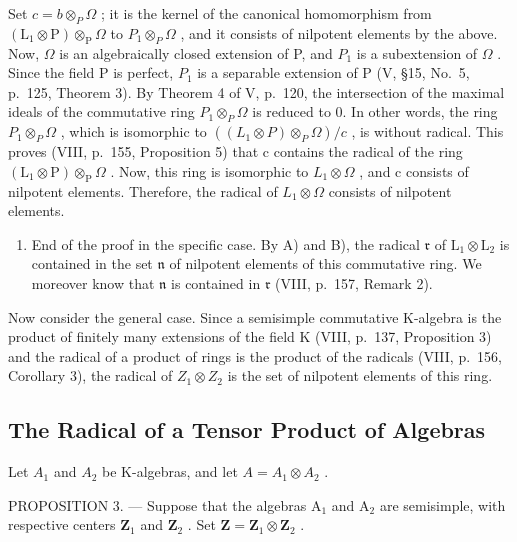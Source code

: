 Set \(c = b \otimes_{P} \Omega\) ; it is the kernel of the canonical homomorphism from \((\mathrm{L}_{1} \otimes \mathrm{P}) \otimes_{\mathrm{P}} \Omega\) to \(P_{1} \otimes_{P} \Omega\) , and it consists of nilpotent elements by the above. Now, \(\Omega\) is an algebraically closed extension of P, and \(P_{1}\) is a subextension of \(\Omega\) . Since the field P is perfect, \(P_{1}\) is a separable extension of P (V, §15, No.~5, p.~125, Theorem 3). By Theorem 4 of V, p.~120, the intersection of the maximal ideals of the commutative ring \(P_{1} \otimes_{P} \Omega\) is reduced to 0. In other words, the ring \(P_{1} \otimes_{P} \Omega\) , which is isomorphic to \(((L_{1} \otimes P) \otimes_{P} \Omega)/c\) , is without radical. This proves (VIII, p.~155, Proposition 5) that c contains the radical of the ring \((\mathrm{L}_{1} \otimes \mathrm{P}) \otimes_{\mathrm{P}} \Omega\) . Now, this ring is isomorphic to \(L_{1} \otimes \Omega\) , and c consists of nilpotent elements. Therefore, the radical of \(L_{1} \otimes \Omega\) consists of nilpotent elements.

\begin{enumerate}
\def\labelenumi{\Alph{enumi})}
\setcounter{enumi}{2}
\tightlist
\item
  End of the proof in the specific case. By A) and B), the radical \(\mathfrak{r}\) of \(\mathrm{L}_1\otimes \mathrm{L}_2\) is contained in the set \(\mathfrak{n}\) of nilpotent elements of this commutative ring. We moreover know that \(\mathfrak{n}\) is contained in \(\mathfrak{r}\) (VIII, p.~157, Remark 2).
\end{enumerate}

Now consider the general case. Since a semisimple commutative K-algebra is the product of finitely many extensions of the field K (VIII, p.~137, Proposition 3) and the radical of a product of rings is the product of the radicals (VIII, p.~156, Corollary 3), the radical of \(Z_{1} \otimes Z_{2}\) is the set of nilpotent elements of this ring.

\subsection{The Radical of a Tensor Product of Algebras}

Let \(A_{1}\) and \(A_{2}\) be K-algebras, and let \(A = A_{1} \otimes A_{2}\) .

PROPOSITION 3. --- Suppose that the algebras \(\mathrm{A}_1\) and \(\mathrm{A}_2\) are semisimple, with respective centers \(\mathbf{Z}_1\) and \(\mathbf{Z}_2\) . Set \(\mathbf{Z} = \mathbf{Z}_1 \otimes \mathbf{Z}_2\) .

